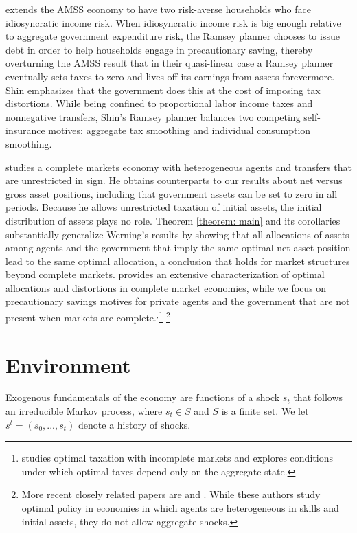 \documentclass[thmsb,11pt]{article}
\begin{document}
\citet{shin2006ramsey} extends the AMSS economy to have two risk-averse households who
face idiosyncratic income risk. When idiosyncratic income risk is big enough
relative to aggregate government expenditure risk, the Ramsey planner
chooses to issue debt in order to help households engage in precautionary
saving, thereby overturning the AMSS result that  in their quasi-linear case a
 Ramsey planner  eventually sets taxes to zero and lives off its earnings from assets forevermore.
  Shin emphasizes that the
government does this at the cost of imposing tax distortions. While being
confined to proportional labor income taxes and nonnegative
transfers, Shin's Ramsey planner balances two competing self-insurance
motives: aggregate tax smoothing and individual consumption smoothing.

\citet{Wer07a} studies a complete markets economy with heterogeneous agents
and transfers that are unrestricted in sign. He obtains counterparts to our
results about net versus gross asset positions, including that government
assets can be set to zero in all periods. Because he allows unrestricted
taxation of initial assets, the initial distribution of assets plays no
role. Theorem \ref{theorem: main} and its corollaries substantially
generalize Werning's results by showing that all allocations of assets among
agents and the government that imply the same optimal net asset position
lead to the same optimal allocation, a conclusion that holds for market
structures beyond complete markets. \citet{Wer07a} provides an extensive
characterization of optimal allocations and distortions in complete market
economies, while we focus on precautionary savings motives for private
agents and the government that are not present when markets are complete.$%
^{,}$\footnote{%
\cite{Werning2012} studies optimal taxation with incomplete markets and explores
conditions under which optimal taxes depend only on the aggregate state.}
\footnote{%
More recent closely related papers are \citet{Azzimonti2008,Azzimonti2008a} and \citet{Correia2010}. While these authors study optimal policy in
 economies in which agents are heterogeneous in skills and initial assets, they
  do not allow aggregate shocks.}


\section{Environment\label{Sec: environment}}

\smallskip  %
Exogenous fundamentals
of the
economy are  functions of a shock  $s_{t}$  that follows an irreducible Markov process, where $s_{t}\in S$ and $S$ is a finite set. We let $s^{t}=\left(
s_{0},...,s_{t}\right) $ denote a history of shocks.
\end{document}
